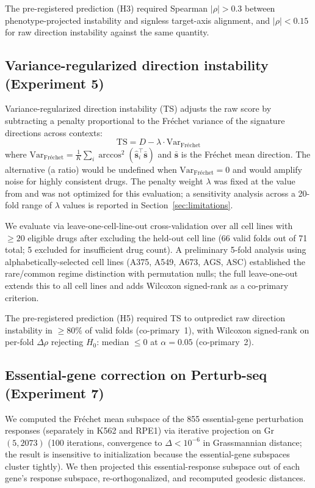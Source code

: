 \documentclass[11pt]{article}
\begin{document}
The pre-registered prediction (H3) required Spearman $|\rho| > 0.3$ between
phenotype-projected instability and signless target-axis alignment, and
$|\rho| < 0.15$ for raw direction instability against the same quantity.

\subsection{Variance-regularized direction instability (Experiment 5)}

Variance-regularized direction instability (TS) adjusts the raw score by
subtracting a penalty proportional to the Fr\'{e}chet variance of the
signature directions across contexts:
\begin{equation}
  \text{TS} = D - \lambda \cdot \text{Var}_{\text{Fr\'echet}}
  \label{eq:ts}
\end{equation}
where $\text{Var}_{\text{Fr\'echet}} = \frac{1}{K}\sum_i
\arccos^2(\hat{\mathbf{s}}_i^\top \bar{\mathbf{s}})$ and
$\bar{\mathbf{s}}$ is the Fr\'echet mean direction. The alternative (a ratio) would be
undefined when $\text{Var}_{\text{Fr\'echet}} = 0$ and would amplify
noise for highly consistent drugs. The penalty weight $\lambda$ was fixed
at the value from \citet{tower2026drug} and was not optimized for this
evaluation; a sensitivity analysis across a 20-fold range of $\lambda$
values is reported in Section~\ref{sec:limitations}.

We evaluate via leave-one-cell-line-out cross-validation over all cell
lines with $\geq 20$ eligible drugs after excluding the held-out cell line
(66 valid folds out of 71 total; 5 excluded for insufficient drug count).
A preliminary 5-fold analysis using alphabetically-selected cell lines
(A375, A549, A673, AGS, ASC) established the rare/common regime distinction
with permutation nulls; the full leave-one-out extends this to all cell
lines and adds Wilcoxon signed-rank as a co-primary criterion.

The pre-registered prediction (H5) required TS to outpredict raw direction instability
in $\geq 80\%$ of valid folds (co-primary~1), with Wilcoxon signed-rank on
per-fold $\Delta\rho$ rejecting $H_0$: median $\leq 0$ at $\alpha = 0.05$
(co-primary~2).

\subsection{Essential-gene correction on Perturb-seq (Experiment 7)}

We computed the Fr\'echet mean subspace of the 855 essential-gene
perturbation responses (separately in K562 and RPE1) via iterative
projection on Gr$(5, 2073)$ (100 iterations, convergence to
$\Delta < 10^{-6}$ in Grassmannian distance; the result is insensitive
to initialization because the essential-gene subspaces cluster tightly).
We then projected this essential-response subspace out of each gene's
response subspace, re-orthogonalized, and recomputed geodesic distances.
\end{document}
